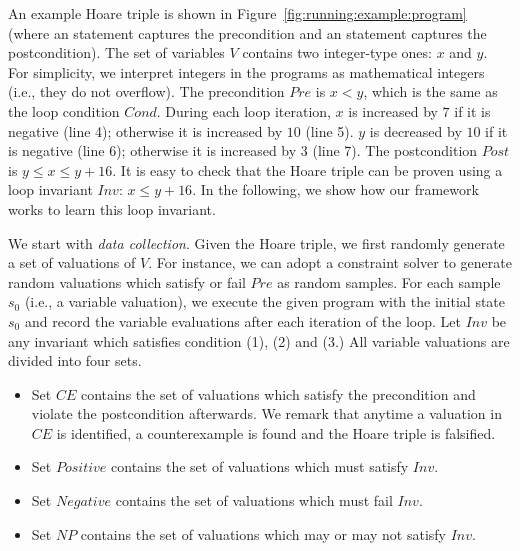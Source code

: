 \begin{example}
An example Hoare triple is shown in Figure~\ref{fig:running:example:program} (where an  statement captures the precondition and an  statement captures the postcondition). The set of variables $V$ contains two integer-type ones: $x$ and $y$. For simplicity, we interpret integers in the programs as mathematical integers (i.e., they do not overflow). The precondition $Pre$ is $x < y$, which is the same as the loop condition $Cond$.
During each loop iteration, $x$ is increased by $7$ if it is negative (line 4); otherwise it is increased by $10$ (line 5). $y$ is decreased by $10$ if it is negative (line 6); otherwise it is increased by $3$ (line 7). The postcondition $Post$ is $y \le x \le y + 16$. It is easy to check that the Hoare triple can be proven using a loop invariant $Inv$: $x \le y + 16$. In the following, we show how our framework works to learn this loop invariant.
\end{example}
We start with \emph{data collection}. Given the Hoare triple, we first randomly generate a set of valuations of $V$. For instance, we can adopt a constraint solver to generate random valuations which satisfy or fail $Pre$ as random samples. For each sample $s_0$ (i.e., a variable valuation), we execute the given program with the initial state $s_0$ and record the variable evaluations after each iteration of the loop. %
Let $Inv$ be any invariant which satisfies condition (1), (2) and (3.) All variable valuations are divided into four sets.
\begin{itemize}
    \item Set $\mathit{CE}$ contains the set of valuations which satisfy the precondition and violate the postcondition afterwards. We remark that anytime a valuation in $\mathit{CE}$ is identified, a counterexample is found and the Hoare triple is falsified.
    \item Set $\mathit{Positive}$ contains the set of valuations which must satisfy $Inv$.
    \item Set $\mathit{Negative}$ contains the set of valuations which must fail $Inv$.
    \item Set $\mathit{NP}$ contains the set of valuations which may or may not satisfy $Inv$.
\end{itemize}
